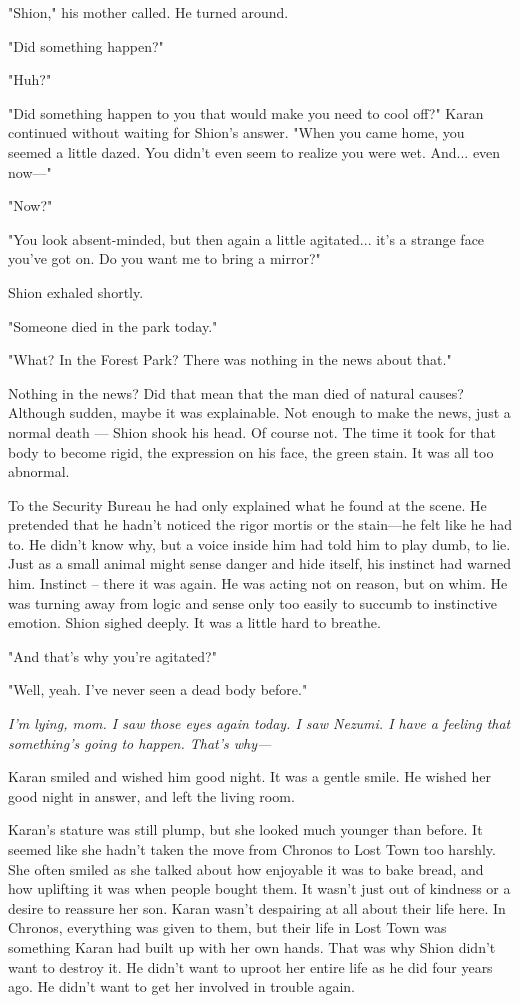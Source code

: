 "Shion," his mother called. He turned around.

"Did something happen?"

"Huh?"

"Did something happen to you that would make you need to cool off?"
Karan continued without waiting for Shion's answer. "When you came home,
you seemed a little dazed. You didn't even seem to realize you were wet.
And... even now---"

"Now?"

"You look absent-minded, but then again a little agitated... it's a
strange face you've got on. Do you want me to bring a mirror?"

Shion exhaled shortly.

"Someone died in the park today."

"What? In the Forest Park? There was nothing in the news about that."

Nothing in the news? Did that mean that the man died of natural causes?
Although sudden, maybe it was explainable. Not enough to make the news,
just a normal death --- Shion shook his head. Of course not. The time it
took for that body to become rigid, the expression on his face, the
green stain. It was all too abnormal.

To the Security Bureau he had only explained what he found at the scene.
He pretended that he hadn't noticed the rigor mortis or the stain---he
felt like he had to. He didn't know why, but a voice inside him had told
him to play dumb, to lie. Just as a small animal might sense danger and
hide itself, his instinct had warned him. Instinct -- there it was again.
He was acting not on reason, but on whim. He was turning away from logic
and sense only too easily to succumb to instinctive emotion. Shion
sighed deeply. It was a little hard to breathe.

"And that's why you're agitated?"

"Well, yeah. I've never seen a dead body before."

\emph{I'm lying, mom. I saw those eyes again today. I saw Nezumi. I have a
feeling that something's going to happen. That's why---}

Karan smiled and wished him good night. It was a gentle smile. He wished
her good night in answer, and left the living room.

Karan's stature was still plump, but she looked much younger than
before. It seemed like she hadn't taken the move from Chronos to Lost
Town too harshly. She often smiled as she talked about how enjoyable it
was to bake bread, and how uplifting it was when people bought them. It
wasn't just out of kindness or a desire to reassure her son. Karan
wasn't despairing at all about their life here. In Chronos, everything
was given to them, but their life in Lost Town was something Karan had
built up with her own hands. That was why Shion didn't want to destroy
it. He didn't want to uproot her entire life as he did four years ago.
He didn't want to get her involved in trouble again.

